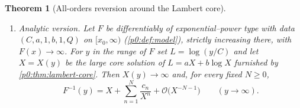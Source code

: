 \documentclass[11pt,a4paper,oneside]{book}
\theoremstyle{plain}
\newtheorem{theorem}{Theorem}[chapter]
\theoremstyle{definition}
\theoremstyle{remark}
\newcommand{\bigO}{\mathcal{O}}
\begin{document}
\begin{theorem}[All-orders reversion around the Lambert core]
\begin{enumerate}
      \begin{equation}\label{p0:eq:formal-exactness}
       a\bigl(\mathsf x-t^{-1}\bigr)+b\log(t\mathsf x)
       +Q\bigl(1/\mathsf x\bigr)=0 .
      \end{equation}
      Equivalently: writing $t=X^{-1}$ and
      $x=X+\sum_{n\ge1}c_nX^{-n}$, the quantity $ax+b\log x+Q(1/x)$ equals
      $aX+b\log X$ to all orders.
\item \emph{Analytic version.}  Let $F$ be differentiably of
      exponential--power type with data $(C,a,1,b,1,Q)$ on $[x_0,\infty)$
      (\cref{p0:def:model}), strictly increasing there, with
      $F(x)\to\infty$.  For $y$ in the range of $F$ set $L=\log(y/C)$ and let
      $X=X(y)$ be the large core solution of $L=aX+b\log X$ furnished by
      \cref{p0:thm:lambert-core}.  Then $X(y)\to\infty$ and, for every fixed
      $N\ge0$,
      \begin{equation}\label{p0:eq:centered-asymptotic}
       F^{-1}(y)=X+\sum_{n=1}^{N}\frac{c_n}{X^{n}}
                 +\bigO\bigl(X^{-N-1}\bigr)
       \qquad(y\to\infty).
      \end{equation}
\end{enumerate}
\end{theorem}
\end{document}
